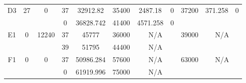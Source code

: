 \begin{sidewaystable}
\begin{tabular}{c||c|c||c|c|c|c|c||c|c|c}
         &
        
      \\
      \hline
      \multirow{2}{*}{D3} &
      \multirow{2}{*}{27} &
      \multirow{2}{*}{0} &
      37 &
      32912.82 &
      35400 &
        2487.18 &
        0 &
      \multirow{2}{*}{37200} &
        \multirow{2}{*}{371.258} &
        \multirow{2}{*}{0}
      \\
      \cline{4-8}
       &
       &
       &
      0 &
      36828.742 &
      41400 &
        4571.258 &
        0 &
      
         &
        
      \\
      \hline
      \multirow{2}{*}{E1} &
      \multirow{2}{*}{0} &
      \multirow{2}{*}{12240} &
      37 &
      45777 &
      36000 &
        \multicolumn{2}{|c||}{N/A} &
      \multirow{2}{*}{39000} &
        \multicolumn{2}{c}{\multirow{2}{*}{N/A}}
      \\
      \cline{4-8}
       &
       &
       &
      39 &
      51795 &
      44400 &
        \multicolumn{2}{|c||}{N/A} &
      
        
      \\
      \hline
      \multirow{2}{*}{F1} &
      \multirow{2}{*}{0} &
      \multirow{2}{*}{0} &
      37 &
      50986.284 &
      57600 &
        \multicolumn{2}{|c||}{N/A} &
      \multirow{2}{*}{63000} &
        \multicolumn{2}{c}{\multirow{2}{*}{N/A}}
      \\
      \cline{4-8}
       &
       &
       &
      0 &
      61919.996 &
      75000 &
        \multicolumn{2}{|c||}{N/A} &
      
        
      \\
\end{tabular}
\label{table:RDS1.txt-1729.tex} 
\end{sidewaystable}
